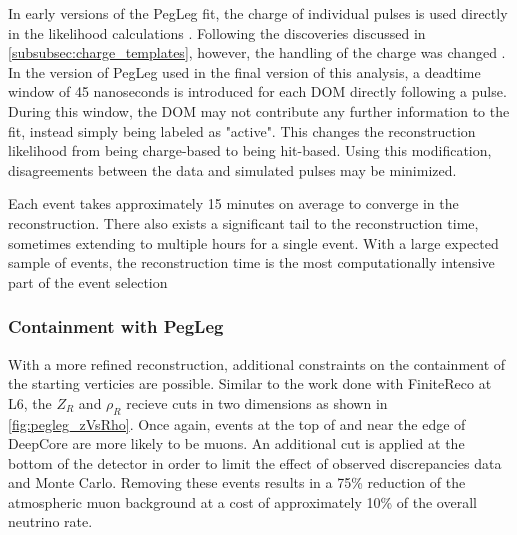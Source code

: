 In early versions of the PegLeg fit, the charge of individual pulses is used directly in the likelihood calculations .
Following the discoveries discussed in \ref{subsubsec:charge_templates}, however, the handling of the charge was changed .
In the version of PegLeg used in the final version of this analysis, a deadtime window of 45 nanoseconds is introduced for each DOM directly following a pulse. 
During this window, the DOM may not contribute any further information to the fit, instead simply being labeled as "active".
This changes the reconstruction likelihood from being charge-based to being hit-based.
Using this modification, disagreements between the data and simulated pulses may be minimized.

Each event takes approximately 15 minutes on average to converge in the reconstruction.
There also exists a significant tail to the reconstruction time, sometimes extending to multiple hours for a single event.
With a large expected sample of events, the reconstruction time is the most computationally intensive part of the event selection

\label{subsubsec:pegleg_containment}
\subsubsection{Containment with PegLeg}
With a more refined reconstruction, additional constraints on the containment of the starting verticies are possible.
Similar to the work done with FiniteReco at L6, the $Z_R$ and $\rho_R$ recieve cuts in two dimensions as shown in \ref{fig:pegleg_zVsRho}.
Once again, events at the top of and near the edge of DeepCore are more likely to be muons.
An additional cut is applied at the bottom of the detector in order to limit the effect of observed discrepancies data and Monte Carlo.
Removing these events results in a 75\% reduction of the atmospheric muon background at a cost of approximately 10\% of the overall neutrino rate.

